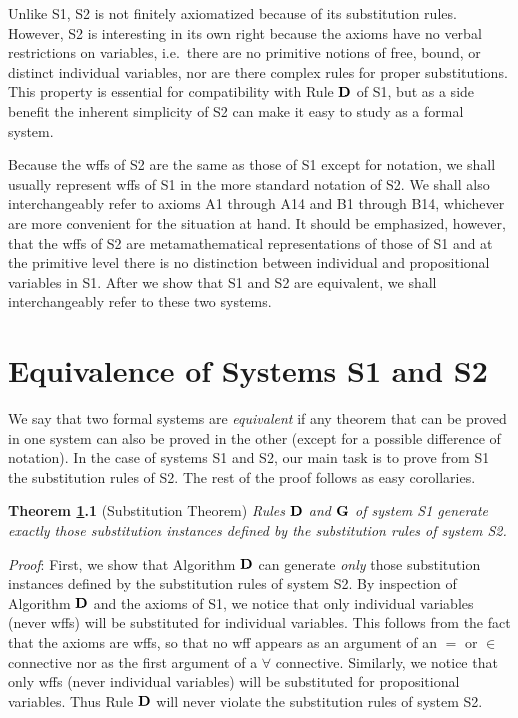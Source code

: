 \documentclass[leqno]{article}
\begin{document}
     Unlike S1, S2 is not finitely axiomatized because of its substitution
rules.  However, S2 is interesting in its own right because the axioms have no
verbal restrictions on variables, i.e.\ there are no primitive notions of free,
bound, or distinct individual variables, nor are there complex rules for
proper substitutions.  This property is essential for compatibility with Rule
${\bf D}$ of S1, but as a side benefit the inherent simplicity of S2 can make
it easy to study as a formal system.

     Because the wffs of S2 are the same as those of S1 except for notation,
we shall usually represent wffs of S1 in the more standard notation of S2.
We shall also interchangeably refer to axioms A1 through A14 and B1 through
B14, whichever are more convenient for the situation at hand.  It should be
emphasized, however, that the wffs of S2 are metamathematical representations
of those of S1 and at the primitive level there is no distinction between
individual and propositional variables in S1.  After we show that S1 and S2
are equivalent, we shall interchangeably refer to these two systems.


\section{Equivalence of Systems S1 and S2}\label{equivs1s2}

     We say that two formal systems are {\em equivalent} if any theorem that
can be proved in one system can also be proved in the other (except for a
possible difference of notation).  In the case of systems S1 and S2, our main
task is to prove from S1 the substitution rules of S2.  The rest of the proof
follows as easy corollaries.


{\bf Theorem \ref{equivs1s2}.1} (Substitution Theorem) \hspace{.5em} {\em Rules ${\bf D}$
and ${\bf G}$ of system {\rm S1} generate exactly those substitution instances
defined by the substitution rules of system {\rm S2}.}

{\em Proof}: First, we show that Algorithm ${\bf D}$ can generate {\em only}
those substitution instances defined by the substitution rules of system S2.
By inspection of Algorithm ${\bf D}$ and the axioms of S1, we notice that only
individual variables (never wffs) will be substituted for individual
variables.  This follows from the fact that the axioms are wffs, so that no
wff appears as an argument of an $=$ or $\in $ connective nor as the first
argument of a $\forall$  connective.  Similarly, we notice that only wffs
(never individual variables) will be substituted for propositional variables.
Thus Rule ${\bf D}$ will never violate the substitution rules of system S2.
\end{document}
